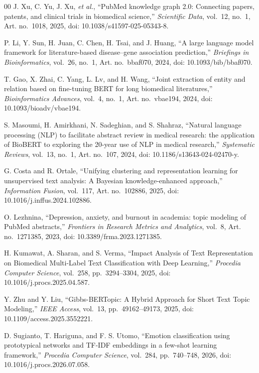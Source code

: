 \documentclass[a4paper,10pt,conference]{IEEEtran}
\begin{document}
\begin{thebibliography}{00}
 J. Xu, C. Yu, J. Xu, \textit{et al.}, ``PubMed knowledge graph 2.0: Connecting papers, patents, and clinical trials in biomedical science,'' \textit{Scientific Data}, vol.~12, no.~1, Art. no.~1018, 2025, doi: 10.1038/s41597-025-05343-8.

 P. Li, Y. Sun, H. Juan, C. Chen, H. Tsai, and J. Huang, ``A large language model framework for literature-based disease–gene association prediction,'' \textit{Briefings in Bioinformatics}, vol.~26, no.~1, Art. no.~bbaf070, 2024, doi: 10.1093/bib/bbaf070.

 T. Gao, X. Zhai, C. Yang, L. Lv, and H. Wang, ``Joint extraction of entity and relation based on fine-tuning BERT for long biomedical literatures,'' \textit{Bioinformatics Advances}, vol.~4, no.~1, Art. no.~vbae194, 2024, doi: 10.1093/bioadv/vbae194.

 S. Masoumi, H. Amirkhani, N. Sadeghian, and S. Shahraz, ``Natural language processing (NLP) to facilitate abstract review in medical research: the application of BioBERT to exploring the 20-year use of NLP in medical research,'' \textit{Systematic Reviews}, vol.~13, no.~1, Art. no.~107, 2024, doi: 10.1186/s13643-024-02470-y.

 G. Costa and R. Ortale, ``Unifying clustering and representation learning for unsupervised text analysis: A Bayesian knowledge-enhanced approach,'' \textit{Information Fusion}, vol.~117, Art. no.~102886, 2025, doi: 10.1016/j.inffus.2024.102886.

 O. Lezhnina, ``Depression, anxiety, and burnout in academia: topic modeling of PubMed abstracts,'' \textit{Frontiers in Research Metrics and Analytics}, vol.~8, Art. no.~1271385, 2023, doi: 10.3389/frma.2023.1271385.

 H. Kumawat, A. Sharan, and S. Verma, ``Impact Analysis of Text Representation on Biomedical Multi-Label Text Classification with Deep Learning,'' \textit{Procedia Computer Science}, vol.~258, pp.~3294--3304, 2025, doi: 10.1016/j.procs.2025.04.587.

 Y. Zhu and Y. Liu, ``Gibbs-BERTopic: A Hybrid Approach for Short Text Topic Modeling,'' \textit{IEEE Access}, vol.~13, pp.~49162--49173, 2025, doi: 10.1109/access.2025.3552221.

 D. Sugianto, T. Hariguna, and F. S. Utomo, ``Emotion classification using prototypical networks and TF-IDF embeddings in a few-shot learning framework,'' \textit{Procedia Computer Science}, vol.~284, pp.~740--748, 2026, doi: 10.1016/j.procs.2026.07.058.


\end{thebibliography}
\end{document}

